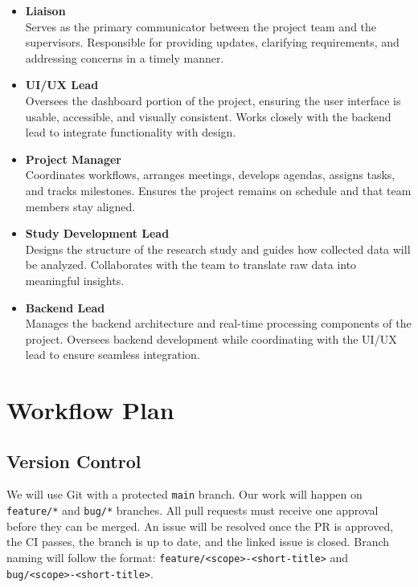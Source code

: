 \documentclass{article}
\begin{document}
\begin{itemize}
    \item \textbf{Liaison} \\
    Serves as the primary communicator between the project team and the supervisors. Responsible for providing updates, clarifying requirements, and addressing concerns in a timely manner.
    
    \item \textbf{UI/UX Lead} \\
    Oversees the dashboard portion of the project, ensuring the user interface is usable, accessible, and visually consistent. Works closely with the backend lead to integrate functionality with design.

    \item \textbf{Project Manager} \\
    Coordinates workflows, arranges meetings, develops agendas, assigns tasks, and tracks milestones. Ensures the project remains on schedule and that team members stay aligned.

    \item \textbf{Study Development Lead} \\
    Designs the structure of the research study and guides how collected data will be analyzed. Collaborates with the team to translate raw data into meaningful insights.

    \item \textbf{Backend Lead} \\
    Manages the backend architecture and real-time processing components of the project. Oversees backend development while coordinating with the UI/UX lead to ensure seamless integration.
\end{itemize}

\section{Workflow Plan}
\subsection*{Version Control}
We will use Git with a protected \texttt{main} branch. Our work will happen on \texttt{feature/*} and \texttt{bug/*} branches. All pull requests must receive one approval before they can be merged. An issue will be resolved once the PR is approved, the CI passes, the branch is up to date, and the linked issue is closed. Branch naming will follow the format:
\texttt{feature/<scope>-<short-title>} and \texttt{bug/<scope>-<short-title>}.
\end{document}
